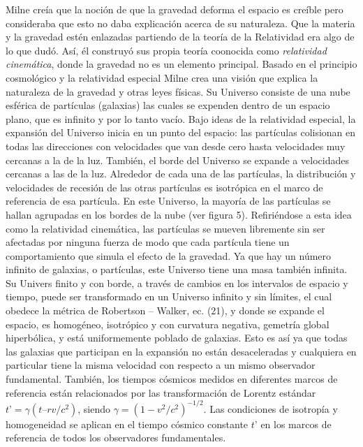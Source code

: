 \documentclass[11pt]{article}
\begin{document}
{    Milne creía que la noción de que la gravedad deforma el espacio es creíble pero consideraba que esto no daba explicación acerca de su naturaleza. Que la materia y la gravedad estén enlazadas partiendo de la teoría de la Relatividad era algo de lo que dudó. Así, él construyó sus propia teoría coonocida como {\textit{relatividad cinemática}}, donde la gravedad no es un elemento principal. Basado en el principio cosmológico y la relatividad especial Milne crea una visión que explica la naturaleza de la gravedad y otras leyes físicas. 
    Su Universo consiste de una nube esférica de partículas (galaxias) las cuales se expenden dentro de un espacio plano, que es infinito y por lo tanto vacío. Bajo ideas de la relatividad especial, la expansión del Universo inicia en un punto del espacio: las partículas colisionan en todas las direcciones con velocidades que van desde cero hasta velocidades muy cercanas a la de la luz. También, el borde del Universo se expande a velocidades cercanas a las de la luz. Alrededor de cada una de las partículas, la distribución y velocidades de recesión de las otras partículas es isotrópica en el marco de referencia de esa partícula. En este Universo, la mayoría de las partículas se hallan agrupadas en los bordes de la nube (ver figura 5). Refiriéndose a esta idea como la relatividad cinemática, las partículas se mueven libremente sin ser afectadas por ninguna fuerza de modo que cada partícula tiene un comportamiento que simula el efecto de la gravedad. 
    Ya que hay un número infinito de galaxias, o partículas, este Universo tiene una masa también infinita. Su Univers finito y con borde, a través de cambios en los intervalos de espacio y tiempo, puede ser transformado en un Universo infinito y sin límites, el cual obedece la métrica de Robertson – Walker, ec. (21), y donde se expande el espacio, es homogéneo, isotrópico y con curvatura negativa, gemetría global hiperbólica, y está uniformemente poblado de galaxias. Esto es así ya que todas las galaxias que participan en la expansión no están desaceleradas y cualquiera en particular tiene la misma velocidad con respecto a un mismo observador fundamental. También, los tiempos cósmicos medidos en diferentes marcos de referencia están relacionados por las transformación de Lorentz estándar $t’ = \gamma(t – rv/c^2)$, siendo $\gamma = (1-v^2/c^2)^{-1/2}$. Las condiciones de isotropía y homogeneidad se aplican en el tiempo cósmico constante $t’$ en los marcos de referencia de todos los observadores fundamentales. 
    
    \newpage


}
\end{document}
